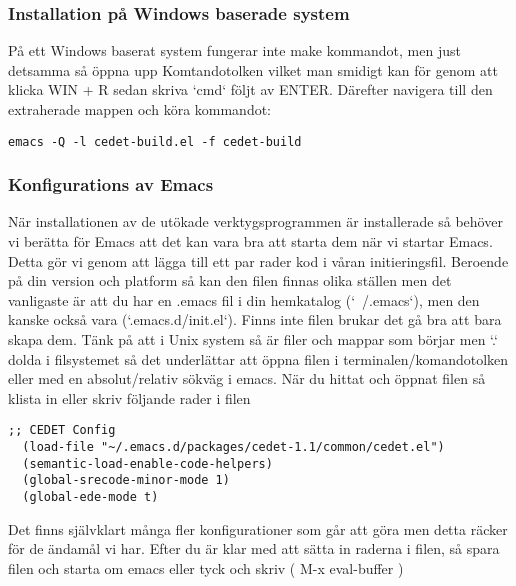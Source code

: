 \documentclass[12pt]{article} %
\begin{document}

\subsubsection{Installation på Windows baserade system}
På ett Windows baserat system fungerar inte make kommandot, men just detsamma så öppna upp Komtandotolken vilket man smidigt kan för genom att klicka WIN + R sedan skriva `cmd` följt av ENTER. Därefter navigera till den extraherade mappen och köra kommandot:
\begin{lstlisting}
emacs -Q -l cedet-build.el -f cedet-build 
\end{lstlisting}





\subsubsection{Konfigurations av Emacs} %
När installationen av de utökade verktygsprogrammen är installerade så behöver vi berätta för Emacs att det kan vara bra att starta dem när vi startar Emacs. Detta gör vi genom att lägga till ett par rader kod i våran initieringsfil. Beroende på din version och platform så kan den filen finnas olika ställen men det vanligaste är att du har en .emacs fil i din hemkatalog (`~/.emacs`), men den kanske också vara (`.emacs.d/init.el`). Finns inte filen brukar det gå bra att bara skapa dem.  Tänk på att i Unix system så är filer och mappar som börjar men `.` dolda i filsystemet så det underlättar att öppna filen i terminalen/komandotolken eller med en absolut/relativ sökväg i emacs. 
När du hittat och öppnat filen så klista in eller skriv följande rader i filen
\begin{lstlisting}
;; CEDET Config
  (load-file "~/.emacs.d/packages/cedet-1.1/common/cedet.el")
  (semantic-load-enable-code-helpers) 
  (global-srecode-minor-mode 1)       
  (global-ede-mode t)
\end{lstlisting}

Det finns självklart många fler konfigurationer som går att göra men detta räcker för de ändamål vi har. Efter du är klar med att sätta in raderna i filen, så spara filen och starta om emacs eller tyck och skriv  ( M-x eval-buffer ) 
\newpage
\end{document}
